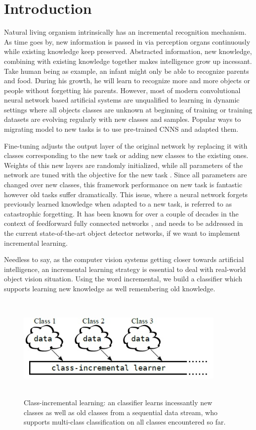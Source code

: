 \documentclass[12pt]{report}
\begin{document}
\chapter{Introduction}
\par Natural living organism intrinsically has an incremental recognition mechanism. As time goes by, new information is passed in via perception organs continuously while existing knowledge keep preserved. Abstracted information, new knowledge, combining with existing knowledge together makes intelligence grow up incessant. Take human being as example, an infant might only be able to recognize parents and food. During his growth, he will learn to recognize more and more objects or people without forgetting his parents. However, most of modern convolutional neural network based artificial systems are unqualified to learning in dynamic settings where all objects classes are unknown at beginning of training or training datasets are evolving regularly with new classes and samples. Popular ways to migrating model to new tasks is to use pre-trained CNNS and adapted them.
\par Fine-tuning\cite{finetune} adjusts the output layer of the original network by replacing it with classes corresponding to the new task or adding new classes to the existing ones. Weights of this new layers are randomly initialized, while all parameters of the network are tuned with the objective for the new task \cite{shmelkov}. Since all parameters are changed over new classes, this framework performance on new task is fantastic however old tasks suffer dramatically. This issue, where a neural network forgets previously learned knowledge when adapted to a new task, is referred to as catastrophic forgetting. It has been known for over a couple of decades in the context of feedforward fully connected networks \cite{chomsky}, and needs to be addressed in the current state-of-the-art object detector networks, if we want to implement incremental learning.
\par Needless to say, as the computer vision systems getting closer towards artificial intelligence, an incremental learning strategy is essential to deal with real-world object vision situation. Using the word incremental, we build a classifier which supports learning new knowledge as well remembering old knowledge.
\begin{figure}
\includegraphics[height = 2in, width = 4in]{1.jpg}
\caption{Class-incremental learning: an classifier learns incessantly new classes as well as old classes from a sequential data stream, who supports multi-class classification on all classes encountered so far.}
\label{fig1}
\end{figure}
\end{document}
